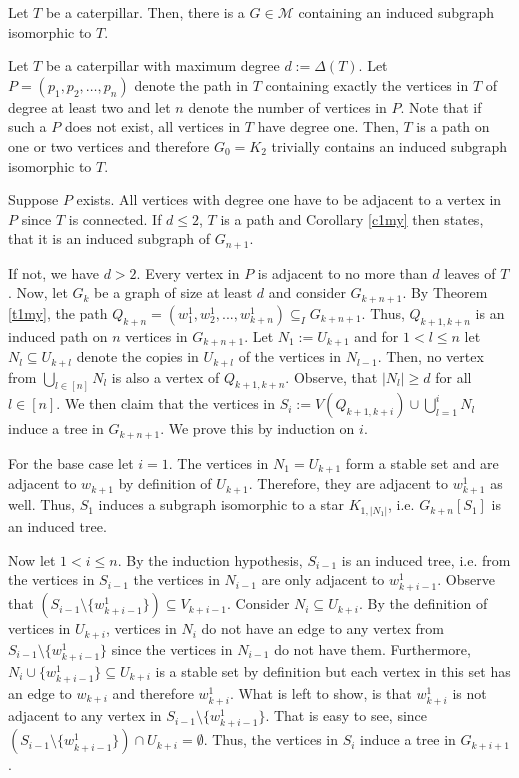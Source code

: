 \begin{thm}
Let $T$ be a caterpillar. Then, there is a $G\in\mathcal{M}$ containing an induced subgraph isomorphic to $T$.
\end{thm}
\begin{prf}
Let $T$ be a caterpillar with maximum degree $d:=\Delta (T)$. Let $P=(p_1, p_2, \dots , p_n)$ denote the path in $T$ containing exactly the vertices in $T$ of degree at least two and let $n$ denote the number of vertices in $P$. Note that if such a $P$ does not exist, all vertices in $T$ have degree one. Then, $T$ is a path on one or two vertices and therefore $G_0=K_2$ trivially contains an induced subgraph isomorphic to $T$.

Suppose $P$ exists. All vertices with degree one have to be adjacent to a vertex in $P$ since $T$ is connected. If $d\leq 2$, $T$ is a path and Corollary \ref{c1my} then states, that it is an induced subgraph of $G_{n+1}$.

If not, we have $d>2$. Every vertex in $P$ is adjacent to no more than $d$ leaves of $T$. Now, let $G_k$ be a graph of size at least $d$ and consider $G_{k+n+1}$. By Theorem \ref{t1my}, the path $Q_{k+n}=(w^1_1,w^1_2,...,w^1_{k+n})\subseteq_I G_{k+n+1}$. Thus, $Q_{k+1,k+n}$ is an induced path on $n$ vertices in $G_{k+n+1}$. Let $N_1:=U_{k+1}$ and for $1<l\leq n$ let $N_l\subseteq U_{k+l}$ denote the copies in $U_{k+l}$ of the vertices in $N_{l-1}$. Then, no vertex from $\bigcup_{l\in [n]}N_l$ is also a vertex of $Q_{k+1,k+n}$. Observe, that $\vert N_l \vert \geq d$ for all $l\in [n]$. We then claim that the vertices in $S_i:=V(Q_{k+1,k+i})\cup\bigcup_{l=1}^i N_l$ induce a tree in $G_{k+n+1}$. We prove this by induction on $i$.

For the base case let $i=1$. The vertices in $N_1=U_{k+1}$ form a stable set  and are adjacent to $w_{k+1}$ by definition of $U_{k+1}$. Therefore, they are adjacent to $w^1_{k+1}$ as well. Thus, $S_1$ induces a subgraph isomorphic to a star $K_{1,\vert N_1\vert}$, i.e. $G_{k+n}[S_1]$ is an induced tree.

Now let $1<i\leq n$. By the induction hypothesis, $S_{i-1}$ is an induced tree, i.e. from the vertices in $S_{i-1}$ the vertices in $N_{i-1}$ are only adjacent to $w_{k+i-1}^1$. Observe that $(S_{i-1}\setminus \lbrace w_{k+i-1}^1\rbrace )\subseteq V_{k+i-1}$. Consider $N_i\subseteq U_{k+i}$. By the definition of vertices in $U_{k+i}$, vertices in $N_i$ do not have an edge to any vertex from $S_{i-1}\setminus \lbrace w_{k+i-1}^1\rbrace$ since the vertices in $N_{i-1}$ do not have them. Furthermore, $N_i\cup\lbrace w_{k+i-1}^1\rbrace \subseteq U_{k+i}$ is a stable set by definition but each vertex in this set has an edge to $w_{k+i}$ and therefore $w_{k+i}^1$. What is left to show, is that $w_{k+i}^1$ is not adjacent to any vertex in $S_{i-1}\setminus \lbrace w_{k+i-1}^1\rbrace$. That is easy to see, since $(S_{i-1}\setminus \lbrace w_{k+i-1}^1\rbrace )\cap U_{k+i}=\emptyset$. Thus, the vertices in $S_i$ induce a tree in $G_{k+i+1}$.


\end{prf}
